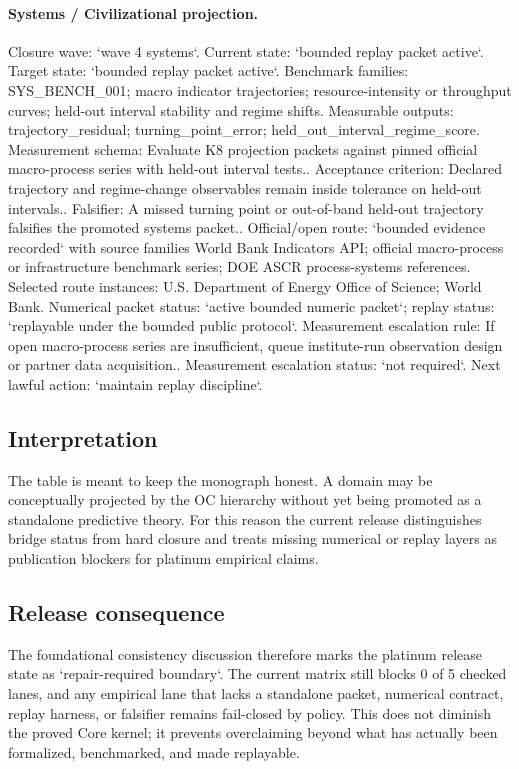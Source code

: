 \paragraph{Systems / Civilizational projection.}
Closure wave: `wave 4 systems`. Current state: `bounded replay packet active`. Target state: `bounded replay packet active`.
Benchmark families: SYS\_BENCH\_001; macro indicator trajectories; resource-intensity or throughput curves; held-out interval stability and regime shifts.
Measurable outputs: trajectory\_residual; turning\_point\_error; held\_out\_interval\_regime\_score.
Measurement schema: Evaluate K8 projection packets against pinned official macro-process series with held-out interval tests..
Acceptance criterion: Declared trajectory and regime-change observables remain inside tolerance on held-out intervals..
Falsifier: A missed turning point or out-of-band held-out trajectory falsifies the promoted systems packet..
Official/open route: `bounded evidence recorded` with source families World Bank Indicators API; official macro-process or infrastructure benchmark series; DOE ASCR process-systems references.
Selected route instances: U.S. Department of Energy Office of Science; World Bank.
Numerical packet status: `active bounded numeric packet`; replay status: `replayable under the bounded public protocol`.
Measurement escalation rule: If open macro-process series are insufficient, queue institute-run observation design or partner data acquisition..
Measurement escalation status: `not required`.
Next lawful action: `maintain replay discipline`.

\subsection{Interpretation}
The table is meant to keep the monograph honest. A domain may be conceptually projected by the OC hierarchy without yet being promoted as a standalone predictive theory.
For this reason the current release distinguishes bridge status from hard closure and treats missing numerical or replay layers as publication blockers for platinum empirical claims.

\subsection{Release consequence}
The foundational consistency discussion therefore marks the platinum release state as `repair-required boundary`.
The current matrix still blocks 0 of 5 checked lanes, and any empirical lane that lacks a standalone packet, numerical contract, replay harness, or falsifier remains fail-closed by policy.
This does not diminish the proved Core kernel; it prevents overclaiming beyond what has actually been formalized, benchmarked, and made replayable.
